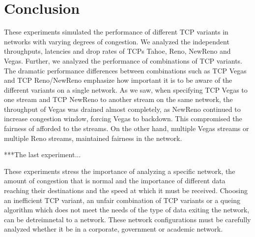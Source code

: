 \section{Conclusion}

These experiments simulated the performance of different TCP variants in networks with varying degrees of congestion. We analyzed the independent throughputs, latencies and drop rates of TCPs Tahoe, Reno, NewReno and Vegas. Further, we analyzed the performance of combinations of TCP variants. The dramatic performance differences between combinations such as TCP Vegas and TCP Reno/NewReno emphasize how important it is to be aware of the different variants on a single network. As we saw, when specifying TCP Vegas to one stream and TCP NewReno to another stream on the same network, the throughput of Vegas was drained almost completely, as NewReno continued to increase congestion window, forcing Vegas to backdown. This compromised the fairness of afforded to the streams. On the other hand, multiple Vegas streams or multiple Reno streams, maintained fairness in the network.

***The last experiment...


These experiments stress the importance of analyzing a specific network, the amount of congestion that is normal and the importance of different data reaching their destinations and the speed at which it must be received. Choosing an inefficient TCP variant, an unfair combination of TCP variants or a queing algorithm which does not meet the needs of the type of data exiting the network, can be detreimnetal to a network. These network configurations must be carefully analyzed whether it be in a corporate, government or academic network.